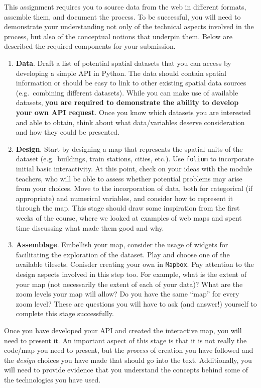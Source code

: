 \documentclass[
  letterpaper,
  DIV=11,
  numbers=noendperiod]{scrreprt}
\providecommand{\tightlist}{%
  \setlength{\itemsep}{0pt}\setlength{\parskip}{0pt}}\usepackage{longtable,booktabs,array}
\begin{document}
This assignment requires you to source data from the web in different
formats, assemble them, and document the process. To be successful, you
will need to demonstrate your understanding not only of the technical
aspects involved in the process, but also of the conceptual notions that
underpin them. Below are described the required components for your
submission.

\begin{enumerate}
\def\labelenumi{\arabic{enumi}.}
\tightlist
\item
  \textbf{Data}. Draft a list of potential spatial datasets that you can
  access by developing a simple API in Python. The data should contain
  spatial information or should be easy to link to other existing
  spatial data sources (e.g.~combining different datasets). While you
  can make use of available datasets, \textbf{you are required to
  demonstrate the ability to develop your own API request}. Once you
  know which datasets you are interested and able to obtain, think about
  what data/variables deserve consideration and how they could be
  presented.
\item
  \textbf{Design}. Start by designing a map that represents the spatial
  units of the dataset (e.g.~buildings, train stations, cities, etc.).
  Use \texttt{folium} to incorporate initial basic interactivity. At
  this point, check on your ideas with the module teachers, who will be
  able to assess whether potential problems may arise from your choices.
  Move to the incorporation of data, both for categorical (if
  appropriate) and numerical variables, and consider how to represent it
  through the map. This stage should draw some inspiration from the
  first weeks of the course, where we looked at examples of web maps and
  spent time discussing what made them good and why.
\item
  \textbf{Assemblage}. Embellish your map, consider the usage of widgets
  for facilitating the exploration of the dataset. Play and choose one
  of the available tilesets. Conisder creating your own in
  \texttt{Mapbox}. Pay attention to the design aspects involved in this
  step too. For example, what is the extent of your map (not necessarily
  the extent of each of your data)? What are the zoom levels your map
  will allow? Do you have the same ``map'' for every zoom level? These
  are questions you will have to ask (and answer!) yourself to complete
  this stage successfully.
\end{enumerate}

Once you have developed your API and created the interactive map, you
will need to present it. An important aspect of this stage is that it is
not really the code/map you need to present, but the \emph{process} of
creation you have followed and the \emph{design} choices you have made
that should go into the text. Additionally, you will need to provide
evidence that you understand the concepts behind some of the
technologies you have used.
\end{document}

